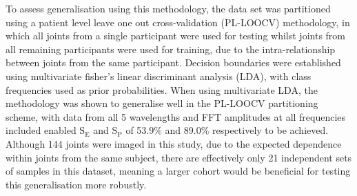 \documentclass[twoside]{bhamthesis}
\theoremstyle{definition}
\begin{document}
To assess generalisation using this methodology, the data set was partitioned using a patient level leave one out cross-validation (PL-LOOCV) methodology, in which all joints from a single participant were used for testing whilst joints from all remaining participants were used for training, due to the intra-relationship between joints from the same participant. Decision boundaries were established using multivariate fisher's linear discriminant analysis (LDA), with class frequencies used as prior probabilities. When using multivariate LDA, the methodology was shown to generalise well in the PL-LOOCV partitioning scheme, with data from all 5 wavelengths and FFT amplitudes at all frequencies included enabled $\mathrm{S_E}$ and $\mathrm{S_P}$ of 53.9\% and 89.0\% respectively to be achieved. Although 144 joints were imaged in this study, due to the expected dependence within joints from the same subject, there are effectively only 21 independent sets of samples in this dataset, meaning a larger cohort would be beneficial for testing this generalisation more robustly.



 


\end{document}
